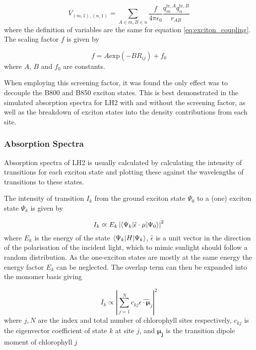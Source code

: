 \begin{equation}
    V_{\left(m, 1\right), \left(n,1\right)} = \sum_{A \in m, B \in n} \frac{f}{4\pi\epsilon_0} \frac{q^{\text{tr},A}_m q^{\text{tr},B}_n}{r_{AB}}
    \label{eq:exciton_coupling}
\end{equation}
%
where the definition of variables are the same for equation \ref{eq:exciton_coupling}.
The scaling factor $f$ is given by

\begin{equation}
    f = A \text{exp}\left(-B R_{ij}\right) + f_0
\end{equation}
%
where $A$, $B$ and $f_0$ are constants. 

When employing this screening factor, it was found the only effect was to decouple
the B800 and B850 exciton states. This is best demonstrated in the simulated absorption
spectra for LH2 with and without the screening factor, as well as the breakdown 
of exciton states into the density contributions from each site.

\subsubsection{Absorption Spectra}
\label{subsubsec:abs_spec}

Absorption spectra of LH2 is usually calculated by calculating the intensity of 
transitions for each exciton state and plotting these against the wavelengths of
transitions to these states. 

The intensity of transition $I_k$ from the ground exciton state $\Psi_0$ to a (one)
exciton state $\Psi_k$ is given by

\begin{equation}
    I_k \varpropto E_k \left\lvert \braket{\Psi_k| \hat{\epsilon} \cdot \mathbf{\mu} | \Psi_0} \right\rvert^2
\end{equation}
%
where $E_k$ is the energy of the state $\braket{\Psi_k|H|\Psi_k}$, $\hat{\epsilon}$
is a unit vector in the direction of the polarisation of the incident light, which
to mimic sunlight should follow a random distribution. As the one-exciton states 
are mostly at the same energy the energy factor $E_k$ can be neglected. The overlap
term can then be expanded into the monomer basis giving

\begin{equation}
    I_k \varpropto \left\lvert \sum^N_{j=1} c_{kj} \hat{\epsilon \cdot \mathbf{\mu}_j }\right\rvert^2
\end{equation}
%
where $j,N$ are the index and total number of chlorophyll sites respectively, $c_{kj}$
is the eigenvector coefficient of state $k$ at site $j$, and $\mathbf{\mu_j}$ is 
the transition dipole moment of chlorophyll $j$ 

